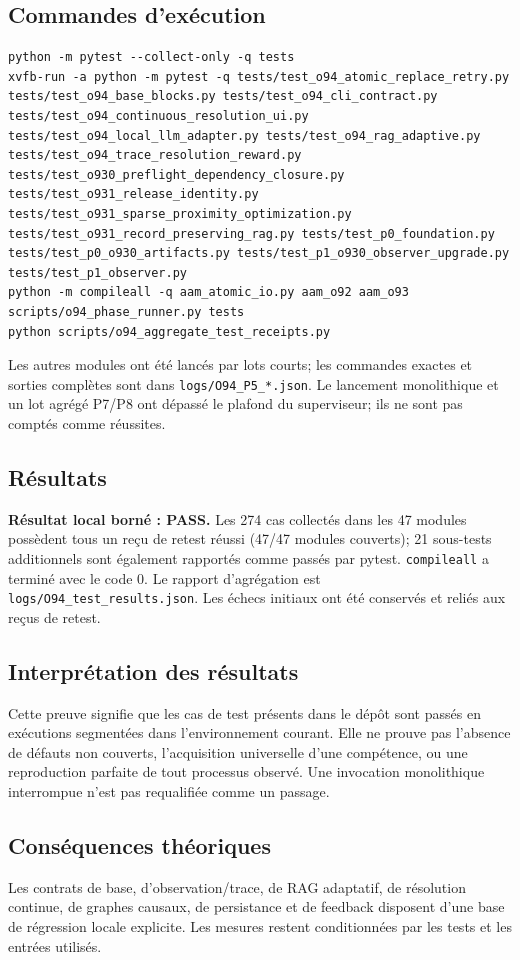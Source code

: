 \documentclass[11pt,a4paper]{article}
\begin{document}
\subsection{Commandes d'exécution}
\begin{verbatim}
python -m pytest --collect-only -q tests
xvfb-run -a python -m pytest -q tests/test_o94_atomic_replace_retry.py tests/test_o94_base_blocks.py tests/test_o94_cli_contract.py tests/test_o94_continuous_resolution_ui.py tests/test_o94_local_llm_adapter.py tests/test_o94_rag_adaptive.py tests/test_o94_trace_resolution_reward.py tests/test_o930_preflight_dependency_closure.py tests/test_o931_release_identity.py tests/test_o931_sparse_proximity_optimization.py tests/test_o931_record_preserving_rag.py tests/test_p0_foundation.py tests/test_p0_o930_artifacts.py tests/test_p1_o930_observer_upgrade.py tests/test_p1_observer.py
python -m compileall -q aam_atomic_io.py aam_o92 aam_o93 scripts/o94_phase_runner.py tests
python scripts/o94_aggregate_test_receipts.py
\end{verbatim}
Les autres modules ont été lancés par lots courts; les commandes exactes et sorties complètes sont dans \texttt{logs/O94\_P5\_*.json}. Le lancement monolithique et un lot agrégé P7/P8 ont dépassé le plafond du superviseur; ils ne sont pas comptés comme réussites.
\subsection{Résultats}
\textbf{Résultat local borné : PASS.} Les 274 cas collectés dans les 47 modules possèdent tous un reçu de retest réussi (47/47 modules couverts); 21 sous-tests additionnels sont également rapportés comme passés par pytest. \texttt{compileall} a terminé avec le code 0. Le rapport d’agrégation est \texttt{logs/O94\_test\_results.json}. Les échecs initiaux ont été conservés et reliés aux reçus de retest.
\subsection{Interprétation des résultats}
Cette preuve signifie que les cas de test présents dans le dépôt sont passés en exécutions segmentées dans l’environnement courant. Elle ne prouve pas l’absence de défauts non couverts, l’acquisition universelle d’une compétence, ou une reproduction parfaite de tout processus observé. Une invocation monolithique interrompue n’est pas requalifiée comme un passage.
\subsection{Conséquences théoriques}
Les contrats de base, d’observation/trace, de RAG adaptatif, de résolution continue, de graphes causaux, de persistance et de feedback disposent d’une base de régression locale explicite. Les mesures restent conditionnées par les tests et les entrées utilisés.
\end{document}
